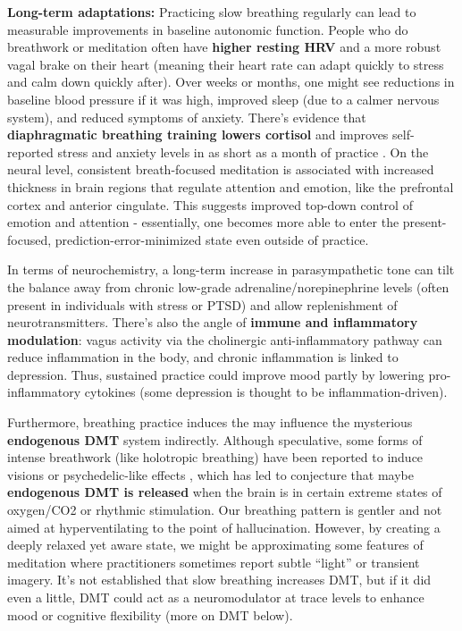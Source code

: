 \documentclass[11pt]{article}
\newcommand{\quotes}[1]{``#1''}
\begin{document}
\textbf{Long-term adaptations:} Practicing slow breathing regularly can lead to measurable improvements in baseline autonomic function. People who do breathwork or meditation often have \textbf{higher resting HRV} and a more robust vagal brake on their heart (meaning their heart rate can adapt quickly to stress and calm down quickly after). Over weeks or months, one might see reductions in baseline blood pressure if it was high, improved sleep (due to a calmer nervous system), and reduced symptoms of anxiety. There's evidence that \textbf{diaphragmatic breathing training lowers cortisol} and improves self-reported stress and anxiety levels in as short as a month of practice \cite{hopper}. On the neural level, consistent breath-focused meditation is associated with increased thickness in brain regions that regulate attention and emotion, like the prefrontal cortex and anterior cingulate. This suggests improved top-down control of emotion and attention - essentially, one becomes more able to enter the present-focused, prediction-error-minimized state even outside of practice.

In terms of neurochemistry, a long-term increase in parasympathetic tone can tilt the balance away from chronic low-grade adrenaline/norepinephrine levels (often present in individuals with stress or PTSD) and allow replenishment of neurotransmitters. There's also the angle of \textbf{immune and inflammatory modulation}: vagus activity via the cholinergic anti-inflammatory pathway can reduce inflammation in the body, and chronic inflammation is linked to depression. Thus, sustained practice could improve mood partly by lowering pro-inflammatory cytokines (some depression is thought to be inflammation-driven).

Furthermore, breathing practice induces the may influence the mysterious \textbf{endogenous DMT} system indirectly. Although speculative, some forms of intense breathwork (like holotropic breathing) have been reported to induce visions or psychedelic-like effects \cite{breathworkDmt,timmermanDmt}, which has led to conjecture that maybe \textbf{endogenous DMT is released} when the brain is in certain extreme states of oxygen/CO2 or rhythmic stimulation. Our breathing pattern is gentler and not aimed at hyperventilating to the point of hallucination. However, by creating a deeply relaxed yet aware state, we might be approximating some features of meditation where practitioners sometimes report subtle \quotes{light} or transient imagery. It's not established that slow breathing increases DMT, but if it did even a little, DMT could act as a neuromodulator at trace levels to enhance mood or cognitive flexibility (more on DMT below).
\end{document}

